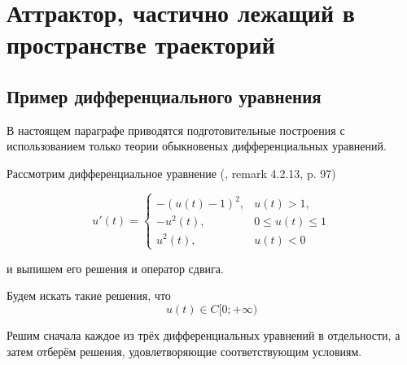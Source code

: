 \section{Аттрактор, частично лежащий в пространстве траекторий}

\subsection{Пример дифференциального уравнения}

В настоящем параграфе приводятся подготовительные построения
с использованием только теории обыкновеных дифференциальных уравнений.

Рассмотрим дифференциальное уравнение (\cite{Vorotnikov}, remark 4.2.13, p. 97)

\begin{equation}\label{primer_iz_statyi}
	u'(t)=
	\left\{
		\begin{array}{ll}
			-(u(t)-1)^2, & u(t) > 1, \\
			-u^2 (t)   , & 0 \leq u(t) \leq 1 \\
			u^2 (t)    , & u(t) < 0
		\end{array}
	\right.
\end{equation}

и выпишем его решения и оператор сдвига.

Будем искать такие решения, что
\begin{equation}
	u(t) \in C[0; +\infty)
\end{equation}

Решим сначала каждое из трёх дифференциальных уравнений в отдельности, а затем отберём решения,
удовлетворяющие соответствующим условиям.

